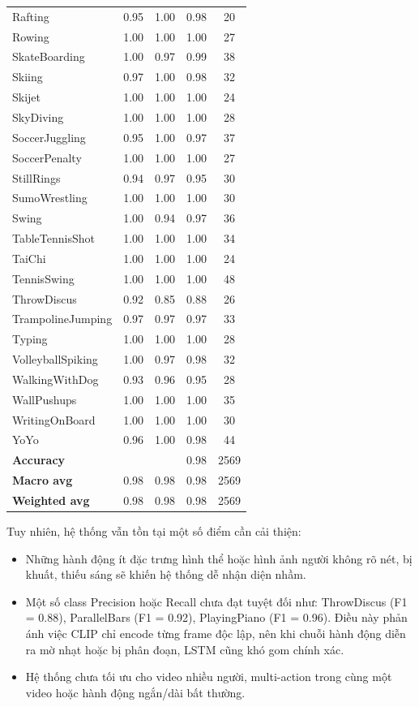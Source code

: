 \documentclass[../main.tex]{subfiles}
\begin{document}
\begin{longtable}{lcccc}
Rafting & 0.95 & 1.00 & 0.98 & 20 \\
Rowing & 1.00 & 1.00 & 1.00 & 27 \\
SkateBoarding & 1.00 & 0.97 & 0.99 & 38 \\
Skiing & 0.97 & 1.00 & 0.98 & 32 \\
Skijet & 1.00 & 1.00 & 1.00 & 24 \\
SkyDiving & 1.00 & 1.00 & 1.00 & 28 \\
SoccerJuggling & 0.95 & 1.00 & 0.97 & 37 \\
SoccerPenalty & 1.00 & 1.00 & 1.00 & 27 \\
StillRings & 0.94 & 0.97 & 0.95 & 30 \\
SumoWrestling & 1.00 & 1.00 & 1.00 & 30 \\
Swing & 1.00 & 0.94 & 0.97 & 36 \\
TableTennisShot & 1.00 & 1.00 & 1.00 & 34 \\
TaiChi & 1.00 & 1.00 & 1.00 & 24 \\
TennisSwing & 1.00 & 1.00 & 1.00 & 48 \\
ThrowDiscus & 0.92 & 0.85 & 0.88 & 26 \\
TrampolineJumping & 0.97 & 0.97 & 0.97 & 33 \\
Typing & 1.00 & 1.00 & 1.00 & 28 \\
VolleyballSpiking & 1.00 & 0.97 & 0.98 & 32 \\
WalkingWithDog & 0.93 & 0.96 & 0.95 & 28 \\
WallPushups & 1.00 & 1.00 & 1.00 & 35 \\
WritingOnBoard & 1.00 & 1.00 & 1.00 & 30 \\
YoYo & 0.96 & 1.00 & 0.98 & 44 \\
\midrule
\textbf{Accuracy} &  &  & 0.98 & 2569 \\
\textbf{Macro avg} & 0.98 & 0.98 & 0.98 & 2569 \\
\textbf{Weighted avg} & 0.98 & 0.98 & 0.98 & 2569 \\
\end{longtable}
Tuy nhiên, hệ thống vẫn tồn tại một số điểm cần cải thiện:
\begin{itemize}
    \item Những hành động ít đặc trưng hình thể hoặc hình ảnh người không rõ nét, bị khuất, thiếu sáng sẽ khiến hệ thống dễ nhận diện nhầm.
    \item Một số class Precision hoặc Recall chưa đạt tuyệt đối như: ThrowDiscus (F1 = 0.88), ParallelBars (F1 = 0.92), PlayingPiano (F1 = 0.96). Điều này phản ánh việc CLIP chỉ encode từng frame độc lập, nên khi chuỗi hành động diễn ra mờ nhạt hoặc bị phân đoạn, LSTM cũng khó gom chính xác.
    \item Hệ thống chưa tối ưu cho video nhiều người, multi-action trong cùng một video hoặc hành động ngắn/dài bất thường.
\end{itemize}
\end{document}
